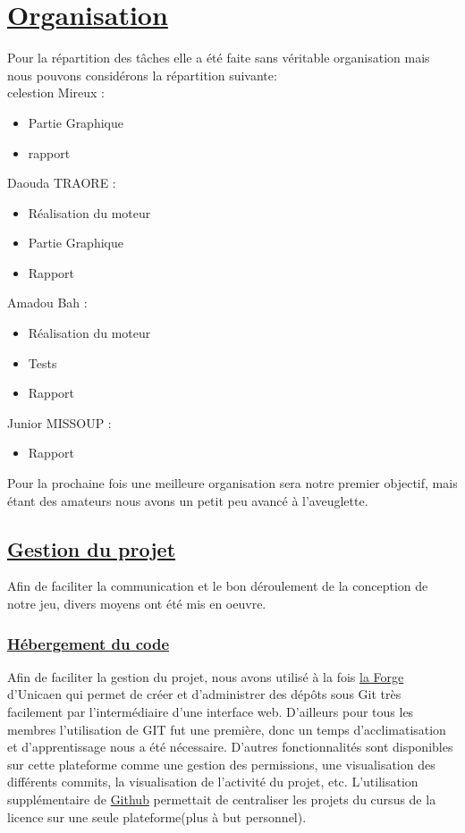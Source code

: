 \documentclass[12pt]{article}
\begin{document}
\section{\underline{Organisation}}
	Pour la répartition des tâches elle a été faite sans véritable organisation  mais nous pouvons considérons la répartition suivante:
 \\
	  celestion Mireux :
	\begin{itemize}
	\item Partie Graphique
	\item  rapport
	\end{itemize}
	Daouda TRAORE :
	\begin{itemize}
	\item Réalisation du moteur
	\item Partie Graphique
	\item  Rapport
	\end{itemize}
	  Amadou Bah :
	\begin{itemize}
	\item Réalisation du moteur
	\item Tests
	\item Rapport
	\end{itemize}
   Junior MISSOUP :
	\begin{itemize}
	\item Rapport
	\end{itemize}
	Pour la prochaine fois une meilleure organisation sera notre premier objectif, mais étant des amateurs nous avons un petit peu avancé à l'aveuglette.\\
\newpage
\subsection{\underline{Gestion du projet}}

Afin de faciliter la communication et le bon déroulement de la conception de notre jeu, divers moyens ont été mis en oeuvre.

\subsubsection{\underline{Hébergement du code}}

	Afin de faciliter la gestion du projet, nous avons utilisé à la fois \href{https://forge.info.unicaen.fr/}{la Forge} d’Unicaen qui permet de créer et d’administrer des dépôts sous Git très facilement par l’intermédiaire d’une interface web. D'ailleurs pour tous les membres l'utilisation de GIT fut une première, donc un temps d'acclimatisation et d'apprentissage nous a été nécessaire. D’autres fonctionnalités sont disponibles  sur cette plateforme comme une gestion des permissions, une visualisation des différents commits, la visualisation de l’activité du projet, etc. L'utilisation supplémentaire de \href{https://github.com/}{Github} permettait de centraliser les projets du cursus de la licence sur une seule plateforme(plus à but personnel).
	
\end{document}
